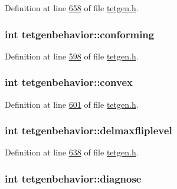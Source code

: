 Definition at line \hyperlink{tetgen_8h_source_l00658}{658} of file \hyperlink{tetgen_8h_source}{tetgen.\+h}.

\subsubsection[{\texorpdfstring{conforming}{conforming}}]{\setlength{\rightskip}{0pt plus 5cm}int tetgenbehavior\+::conforming}\hypertarget{classtetgenbehavior_ac02fe16d48959b6ba9d85a1a3f5a0187}{}\label{classtetgenbehavior_ac02fe16d48959b6ba9d85a1a3f5a0187}


Definition at line \hyperlink{tetgen_8h_source_l00598}{598} of file \hyperlink{tetgen_8h_source}{tetgen.\+h}.

\subsubsection[{\texorpdfstring{convex}{convex}}]{\setlength{\rightskip}{0pt plus 5cm}int tetgenbehavior\+::convex}\hypertarget{classtetgenbehavior_a691a8d3d667ed0709c7995248731c57d}{}\label{classtetgenbehavior_a691a8d3d667ed0709c7995248731c57d}


Definition at line \hyperlink{tetgen_8h_source_l00601}{601} of file \hyperlink{tetgen_8h_source}{tetgen.\+h}.

\subsubsection[{\texorpdfstring{delmaxfliplevel}{delmaxfliplevel}}]{\setlength{\rightskip}{0pt plus 5cm}int tetgenbehavior\+::delmaxfliplevel}\hypertarget{classtetgenbehavior_a4da6a5712b049c2bd9585fb6fe1d6cba}{}\label{classtetgenbehavior_a4da6a5712b049c2bd9585fb6fe1d6cba}


Definition at line \hyperlink{tetgen_8h_source_l00638}{638} of file \hyperlink{tetgen_8h_source}{tetgen.\+h}.

\subsubsection[{\texorpdfstring{diagnose}{diagnose}}]{\setlength{\rightskip}{0pt plus 5cm}int tetgenbehavior\+::diagnose}\hypertarget{classtetgenbehavior_a40cd0446f3d881658ed5754a3002c46e}{}\label{classtetgenbehavior_a40cd0446f3d881658ed5754a3002c46e}


